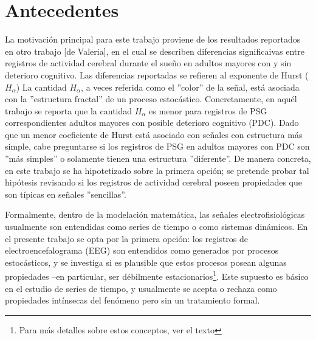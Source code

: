 \documentclass[12pt,a4paper]{mitthesis}
\begin{document}

\chapter{Antecedentes}

La motivaci\'on principal para este trabajo proviene de los resultados reportados en otro trabajo 
[de Valeria], en el cual se describen diferencias significaivas entre registros de actividad
cerebral durante el sue\~no en adultos mayores con y sin deterioro cognitivo. 
Las diferencias 
reportadas se refieren al exponente de Hurst ($H_\alpha$) 
La cantidad $H_\alpha$, a veces referida como el ''color'' de la se\~nal, est\'a asociada con la
''estructura fractal'' de un proceso estoc\'astico. Concretamente, en aqu\'el trabajo 
se reporta que la cantidad $H_\alpha$ es menor para registros de PSG correspondientes adultos 
mayores con posible deterioro cognitivo (PDC). Dado que un menor coeficiente de Hurst est\'a 
asociado con se\~nales con estructura m\'as simple, cabe preguntarse si los registros de PSG en 
adultos mayores con PDC son ''m\'as simples'' o solamente tienen una estructura ''diferente''. De 
manera concreta, en este trabajo se ha hipotetizado sobre la primera opci\'on; se pretende probar
tal hip\'otesis revisando si los registros de actividad cerebral poseen propiedades que son
t\'ipicas en se\~nales ''sencillas''.

Formalmente, dentro de la modelaci\'on matem\'atica, las se\~nales electrofisiol\'ogicas usualmente 
son entendidas como series de tiempo o como sistemas din\'amicos.
En el presente trabajo se opta por la primera opci\'on: los registros de electroencefalograma (EEG)
son entendidos como generados por procesos estoc\'asticos, y se investiga si es plausible que estos
procesos posean algunas propiedades --en particular, ser d\'ebilmente estacionarios\footnote{Para
m\'as detalles sobre estos conceptos, ver el texto}.
Este supuesto es b\'asico en el estudio de series de tiempo, y usualmente se acepta o rechaza como 
propiedades int\'insecas del fen\'omeno pero sin un tratamiento formal.
\end{document}
